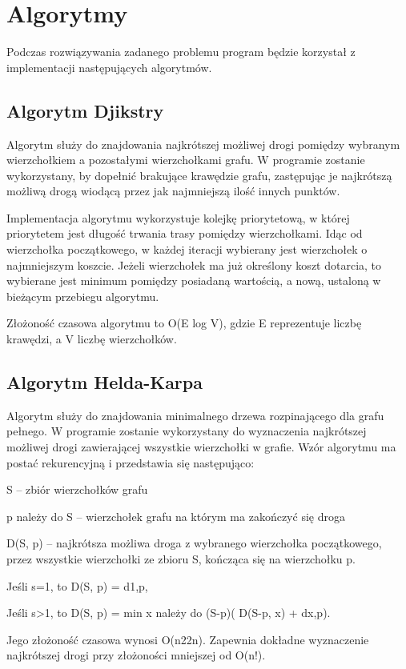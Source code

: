 \documentclass{article}
\begin{document}
\section{Algorytmy}
Podczas rozwiązywania zadanego problemu program będzie korzystał z implementacji następujących algorytmów.

\subsection{Algorytm Djikstry}
Algorytm służy do znajdowania najkrótszej możliwej drogi pomiędzy wybranym wierzchołkiem a pozostałymi wierzchołkami grafu. W programie zostanie wykorzystany, by dopełnić brakujące krawędzie grafu, zastępując je najkrótszą możliwą drogą wiodącą przez jak najmniejszą ilość innych punktów. 

Implementacja algorytmu wykorzystuje kolejkę priorytetową, w której priorytetem jest długość trwania trasy pomiędzy wierzchołkami. Idąc od wierzchołka początkowego, w każdej iteracji wybierany jest wierzchołek o najmniejszym koszcie. Jeżeli wierzchołek ma już określony koszt dotarcia, to wybierane jest minimum pomiędzy posiadaną wartością, a nową, ustaloną w bieżącym przebiegu algorytmu.

Złożoność czasowa algorytmu to O(E log V), gdzie E reprezentuje liczbę krawędzi, a V liczbę wierzchołków.

\subsection{Algorytm Helda-Karpa}
Algorytm służy do znajdowania minimalnego drzewa rozpinającego dla grafu pełnego. W programie zostanie wykorzystany do wyznaczenia najkrótszej możliwej drogi zawierającej wszystkie wierzchołki w grafie. Wzór algorytmu ma postać rekurencyjną i przedstawia się następująco:

    S -- zbiór wierzchołków grafu
    
    p należy do S -- wierzchołek grafu na którym ma zakończyć się droga
    
    D(S, p) -- najkrótsza możliwa droga z wybranego wierzchołka początkowego, przez wszystkie wierzchołki ze zbioru S, kończąca się na wierzchołku p.

    Jeśli s=1, to D(S, p) = d1,p,
    
    Jeśli s>1, to D(S, p) = min x należy do (S-{p})( D(S-{p}, x) + dx,p).

Jego złożoność czasowa wynosi O(n22n). Zapewnia dokładne wyznaczenie najkrótszej drogi przy złożoności mniejszej od O(n!).
\end{document}
